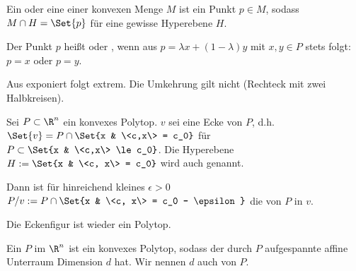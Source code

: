 \begin{df}
    Ein  oder eine  einer konvexen Menge $M$ ist ein Punkt $p \in M$, sodass $M \cap H = \Set{p}$ für eine gewisse Hyperebene $H$.

    Der Punkt $p$ heißt  oder , wenn aus $p = \lambda x + (1-\lambda)y$ mit $x,y \in P$ stets folgt: $p = x$ oder $p = y$.
    \begin{note}
        Aus exponiert folgt extrem.
        Die Umkehrung gilt nicht (Rechteck mit zwei Halbkreisen).
    \end{note}
\end{df}

\begin{df}[Eckenfigur]
    Sei $P \subset \R^n$ ein konvexes Polytop.
    $v$ sei eine Ecke von $P$, d.h.
    \begin{math}
        \Set{v} =
        P \cap \Set{x & \<c,x\> = c_0}
    \end{math}
    für $P \subset \Set{x & \<c,x\> \le c_0}$.
    Die Hyperebene $H := \Set{x & \<c, x\> = c_0}$ wird auch  genannt.

    Dann ist für hinreichend kleines $\epsilon > 0$
    \begin{math}
        P / v := P \cap \Set{x & \<c, x\> = c_0 - \epsilon}
    \end{math}
    die  von $P$ in $v$.
    \begin{note}
        Die Eckenfigur ist wieder ein Polytop.
    \end{note}
\end{df}


\begin{df}
    Ein  $P$ im $\R^n$ ist ein konvexes Polytop, sodass der durch $P$ aufgespannte affine Unterraum Dimension $d$ hat.
    Wir nennen $d$ auch  von $P$.
\end{df}


